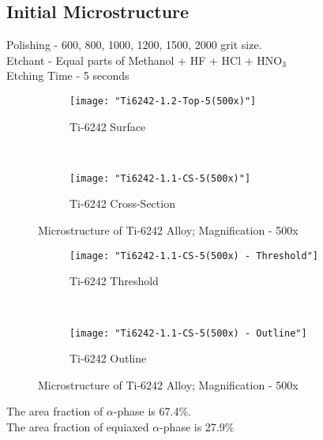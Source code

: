 \subsection{Initial Microstructure}
Polishing - 600, 800, 1000, 1200, 1500, 2000 grit size. \\
Etchant - Equal parts of Methanol + HF + HCl + HNO$_{3}$ \\
Etching Time - 5 seconds

\begin{figure}[H]
    \centering
    \begin{subfigure}{0.49\textwidth}
        \texttt{[image: "Ti6242-1.2-Top-5(500x)"]}
        \caption{Ti-6242 Surface}
        \label{fig:Ti-6242 Surface}
    \end{subfigure}
    ~
    \begin{subfigure}{0.49\textwidth}
        \texttt{[image: "Ti6242-1.1-CS-5(500x)"]}
        \caption{Ti-6242 Cross-Section}
        \label{fig:Ti-6242 Cross-Section}
    \end{subfigure}
  
    \caption{Microstructure of Ti-6242 Alloy; Magnification - 500x}
    \label{fig:As-Received}
\end{figure}

\begin{figure}[H]
    \centering
    \begin{subfigure}{0.49\textwidth}
        \texttt{[image: "Ti6242-1.1-CS-5(500x) - Threshold"]}
        \caption{Ti-6242 Threshold}
        \label{fig:Ti-6242 Threshold}
    \end{subfigure}
    ~
    \begin{subfigure}{0.49\textwidth}
        \texttt{[image: "Ti6242-1.1-CS-5(500x) - Outline"]}
        \caption{Ti-6242 Outline}
        \label{fig:Ti-6242 Outline}
    \end{subfigure}
  
    \caption{Microstructure of Ti-6242 Alloy; Magnification - 500x}
    \label{fig:As-Received}
\end{figure}


The area fraction of $\alpha$-phase is 67.4\%. \\
The area fraction of equiaxed $\alpha$-phase is 27.9\% \\
